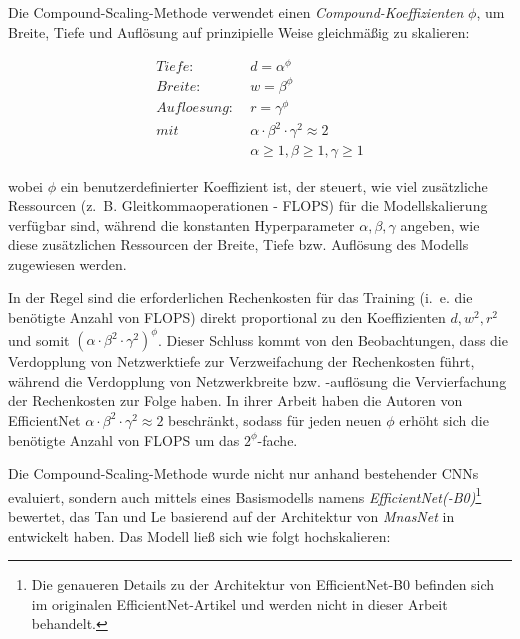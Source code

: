 Die Compound-Scaling-Methode verwendet einen \emph{Compound-Koeffizienten} $\phi$, um Breite, Tiefe und Auflösung auf prinzipielle Weise gleichmäßig zu skalieren:

\begin{equation} \label{eq:compoundscaling}
	\begin{split}
		Tiefe: &\; d = \alpha^\phi \\
		Breite: &\; w = \beta^\phi \\
		Aufloesung: &\; r = \gamma^\phi \\
		mit &\; \alpha\cdot\beta^2\cdot\gamma^2 \approx 2 \\
		&\; \alpha \geq 1, \beta \geq 1, \gamma \geq 1
	\end{split}
\end{equation}

wobei $\phi$ ein benutzerdefinierter Koeffizient ist, der steuert, wie viel zusätzliche Ressourcen (z.~B. Gleitkommaoperationen - FLOPS) für die Modellskalierung verfügbar sind, während die konstanten Hyperparameter $\alpha, \beta, \gamma$ angeben, wie diese zusätzlichen Ressourcen der Breite, Tiefe bzw. Auflösung des Modells zugewiesen werden. 

In der Regel sind die erforderlichen Rechenkosten für das Training (i.~e. die benötigte Anzahl von FLOPS) direkt proportional zu den Koeffizienten $d, w^2, r^2$ und somit $(\alpha\cdot\beta^2\cdot\gamma^2)^\phi$. Dieser Schluss kommt von den Beobachtungen, dass die Verdopplung von Netzwerktiefe zur Verzweifachung der Rechenkosten führt, während die Verdopplung von Netzwerkbreite bzw. -auflösung die Vervierfachung der Rechenkosten zur Folge haben. In ihrer Arbeit haben die Autoren von EfficientNet  $\alpha\cdot\beta^2\cdot\gamma^2 \approx 2$ beschränkt, sodass für jeden neuen $\phi$ erhöht sich die benötigte Anzahl von FLOPS um das $2^\phi$-fache.

Die Compound-Scaling-Methode wurde nicht nur anhand bestehender CNNs evaluiert, sondern auch mittels eines Basismodells namens \emph{EfficientNet(-B0)}\footnote{Die genaueren Details zu der Architektur von EfficientNet-B0 befinden sich im originalen EfficientNet-Artikel \cite{tan2020efficientnet} und werden nicht in dieser Arbeit behandelt.} bewertet, das Tan und Le basierend auf der Architektur von \emph{MnasNet} in \cite{tan2019mnasnet} entwickelt haben. Das Modell ließ sich wie folgt hochskalieren:


